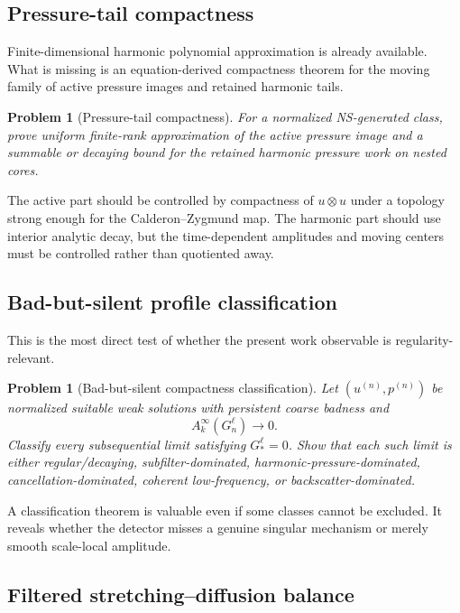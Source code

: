 \documentclass[11pt]{article}
\numberwithin{equation}{section}
\newtheorem{problem}[theorem]{Problem}
\theoremstyle{remark}
\begin{document}
\subsection{Pressure-tail compactness}

Finite-dimensional harmonic polynomial approximation is already available. What is missing is an equation-derived compactness theorem for the moving family of active pressure images and retained harmonic tails.

\begin{problem}[Pressure-tail compactness]\label{prob:pressure-tail}
For a normalized NS-generated class, prove uniform finite-rank approximation of the active pressure image and a summable or decaying bound for the retained harmonic pressure work on nested cores.
\end{problem}

The active part should be controlled by compactness of $u\otimes u$ under a topology strong enough for the Calderon--Zygmund map. The harmonic part should use interior analytic decay, but the time-dependent amplitudes and moving centers must be controlled rather than quotiented away.

\subsection{Bad-but-silent profile classification}

This is the most direct test of whether the present work observable is regularity-relevant.

\begin{problem}[Bad-but-silent compactness classification]\label{prob:silent-classification}
Let $(u^{(n)},p^{(n)})$ be normalized suitable weak solutions with persistent coarse badness and
\[
A_k^\infty(G_n^\ell)\to0.
\]
Classify every subsequential limit satisfying $G_*^\ell=0$. Show that each such limit is either regular/decaying, subfilter-dominated, harmonic-pressure-dominated, cancellation-dominated, coherent low-frequency, or backscatter-dominated.
\end{problem}

A classification theorem is valuable even if some classes cannot be excluded. It reveals whether the detector misses a genuine singular mechanism or merely smooth scale-local amplitude.


\subsection{Filtered stretching--diffusion balance}
\end{document}
